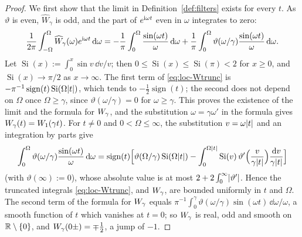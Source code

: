 \begin{proof}
We first show that the limit in Definition~\ref{def:filters} exists for every $t$. As $\vartheta$ is even,
$\widehat W_\gamma$ is odd, and the part of $e^{\mathrm{i}\omega t}$ even in $\omega$ integrates to zero:
\begin{equation}\label{eq:loc-Wtrunc}
\frac1{2\pi}\int_{-\Omega}^\Omega\widehat W_\gamma(\omega)e^{\mathrm{i}\omega t}\,\mathrm{d}\omega
=-\frac1\pi\int_0^\Omega\frac{\sin(\omega t)}{\omega}\,\mathrm{d}\omega+\frac1\pi\int_0^\Omega\vartheta(\omega/\gamma)\frac{\sin(\omega t)}{\omega}\,\mathrm{d}\omega .
\end{equation}
Let $\operatorname{Si}(x):=\int_0^x\sin v\,\dd v/v$; then $0\le\operatorname{Si}(x)\le\operatorname{Si}(\pi)<2$ for $x\ge0$, and
$\operatorname{Si}(x)\to\pi/2$ as $x\to\infty$. The first term of \eqref{eq:loc-Wtrunc} is
$-\pi^{-1}\operatorname{sign}(t)\operatorname{Si}(\Omega\lvert t\rvert)$, which tends to $-\frac12\operatorname{sign}(t)$; the second
does not depend on $\Omega$ once $\Omega\ge\gamma$, since $\vartheta(\omega/\gamma)=0$ for $\omega\ge\gamma$. This proves the
existence of the limit and the formula for $W_{\gamma}$, and the substitution $\omega=\gamma\omega'$ in the formula gives
$W_{\gamma}(t)=W_1(\gamma t)$. For $t\ne0$ and $0<\Omega\le\infty$, the substitution $v=\omega\lvert t\rvert$ and an integration by
parts give
\[
\int_0^\Omega\vartheta(\omega/\gamma)\frac{\sin(\omega t)}{\omega}\,\mathrm{d}\omega=\operatorname{sign}(t)\Bigl[\vartheta(\Omega/\gamma)\operatorname{Si}(\Omega\lvert t\rvert)
-\int_0^{\Omega\lvert t\rvert}\operatorname{Si}(v)\,\vartheta'\Bigl(\frac v{\gamma\lvert t\rvert}\Bigr)\frac{\mathrm{d} v}{\gamma\lvert t\rvert}\Bigr]
\]
(with $\vartheta(\infty):=0$), whose absolute value is at most $2+2\int_0^\infty\lvert\vartheta'\rvert$. Hence the truncated integrals
\eqref{eq:loc-Wtrunc}, and $W_{\gamma}$, are bounded uniformly in $t$ and $\Omega$. The second term of the formula for $W_{\gamma}$
equals $\pi^{-1}\int_0^\gamma\vartheta(\omega/\gamma)\sin(\omega t)\,\dd\omega/\omega$, a smooth function of $t$ which vanishes
at $t=0$; so $W_{\gamma}$ is real, odd and smooth on $\mathbb{R}\setminus\{0\}$, and $W_{\gamma}(0\pm)=\mp\frac12$, a jump of $-1$.


\end{proof}

